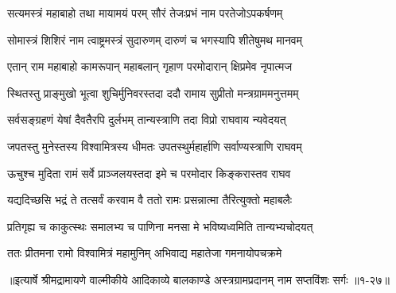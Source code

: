 \twolineshloka
{सत्यमस्त्रं महाबाहो तथा मायामयं परम्}
{सौरं तेजःप्रभं नाम परतेजोऽपकर्षणम्} %

\twolineshloka
{सोमास्त्रं शिशिरं नाम त्वाष्ट्रमस्त्रं सुदारुणम्}
{दारुणं च भगस्यापि शीतेषुमथ मानवम्} %

\twolineshloka
{एतान् राम महाबाहो कामरूपान् महाबलान्}
{गृहाण परमोदारान् क्षिप्रमेव नृपात्मज} %

\twolineshloka
{स्थितस्तु प्राङ्मुखो भूत्वा शुचिर्मुनिवरस्तदा}
{ददौ रामाय सुप्रीतो मन्त्रग्राममनुत्तमम्} %

\twolineshloka
{सर्वसङ्ग्रहणं येषां दैवतैरपि दुर्लभम्}
{तान्यस्त्राणि तदा विप्रो राघवाय न्यवेदयत्} %

\twolineshloka
{जपतस्तु मुनेस्तस्य विश्वामित्रस्य धीमतः}
{उपतस्थुर्महार्हाणि सर्वाण्यस्त्राणि राघवम्} %

\twolineshloka
{ऊचुश्च मुदिता रामं सर्वे प्राञ्जलयस्तदा}
{इमे च परमोदार किङ्करास्तव राघव} %

\twolineshloka
{यद्यदिच्छसि भद्रं ते तत्सर्वं करवाम वै}
{ततो रामः प्रसन्नात्मा तैरित्युक्तो महाबलैः} %

\twolineshloka
{प्रतिगृह्य च काकुत्स्थः समालभ्य च पाणिना}
{मनसा मे भविष्यध्वमिति तान्यभ्यचोदयत्} %

\twolineshloka
{ततः प्रीतमना रामो विश्वामित्रं महामुनिम्}
{अभिवाद्य महातेजा गमनायोपचक्रमे} %


॥इत्यार्षे श्रीमद्रामायणे वाल्मीकीये आदिकाव्ये बालकाण्डे अस्त्रग्रामप्रदानम् नाम सप्तविंशः सर्गः ॥१-२७॥

